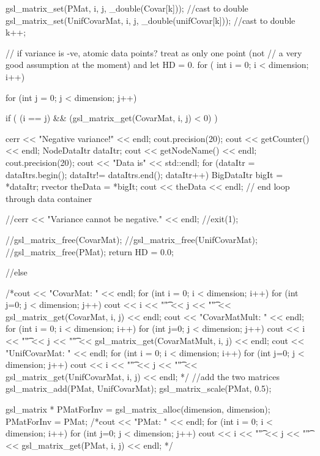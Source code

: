 \begin{DoxyCode}
{{{{          gsl_matrix_set(PMat, i, j, _double(Covar[k])); //cast to double
          gsl_matrix_set(UnifCovarMat, i, j, _double(unifCovar[k])); //cast to
       double
          k++;
        }
      }

      // if variance is -ve, atomic data points? treat as only one point (not
      // a very good assumption at the moment) and let HD = 0. 
      for ( int i = 0; i < dimension; i++) {
        for (int j = 0; j < dimension; j++) {
          if ( (i == j) && (gsl_matrix_get(CovarMat, i, j) < 0) ) {
            cerr << "Negative variance!" << endl;
            cout.precision(20);
            cout << getCounter() << endl;
            NodeDataItr dataItr;
            cout << getNodeName() << endl;
            cout.precision(20);
            cout << "Data is" << std::endl;
            for (dataItr = dataItrs.begin();
              dataItr!= dataItrs.end(); dataItr++) {
              BigDataItr bigIt = *dataItr;
              rvector theData = *bigIt;
              cout << theData << endl; 
            } // end loop through data container
        
            //cerr << "Variance cannot be negative." << endl; 
            //exit(1); 
            
            
            //gsl_matrix_free(CovarMat);
            //gsl_matrix_free(UnifCovarMat);
            //gsl_matrix_free(PMat);
            return HD = 0.0;
             
          }
        }
      }
  
      //else {
        /*cout << "CovarMat: " << endl;
        for (int i = 0; i < dimension; i++) {
          for (int j=0; j < dimension; j++) {
            cout << i << "\t" << j << "\t" << gsl_matrix_get(CovarMat, i, j) <<
       endl; 
          }
        }
        cout << "CovarMatMult: " << endl;
        for (int i = 0; i < dimension; i++) {
          for (int j=0; j < dimension; j++) {
            cout << i << "\t" << j << "\t" << gsl_matrix_get(CovarMatMult, i,
       j) << endl; 
          }
        }
        cout << "UnifCovarMat: " << endl;
        for (int i = 0; i < dimension; i++) {
          for (int j=0; j < dimension; j++) {
            cout << i << "\t" << j << "\t" << gsl_matrix_get(UnifCovarMat, i,
       j) << endl; 
          }
        }   
          */
        //add the two matrices
        gsl_matrix_add(PMat, UnifCovarMat);
        gsl_matrix_scale(PMat, 0.5);
        
        gsl_matrix * PMatForInv = gsl_matrix_alloc(dimension, dimension);
        PMatForInv = PMat; 
        /*cout << "PMat: " << endl;
        for (int i = 0; i < dimension; i++) {
          for (int j=0; j < dimension; j++) {
            cout << i << "\t" << j << "\t" << gsl_matrix_get(PMat, i, j) <<
       endl; 
          }
        }*/

}}}
\end{DoxyCode}
